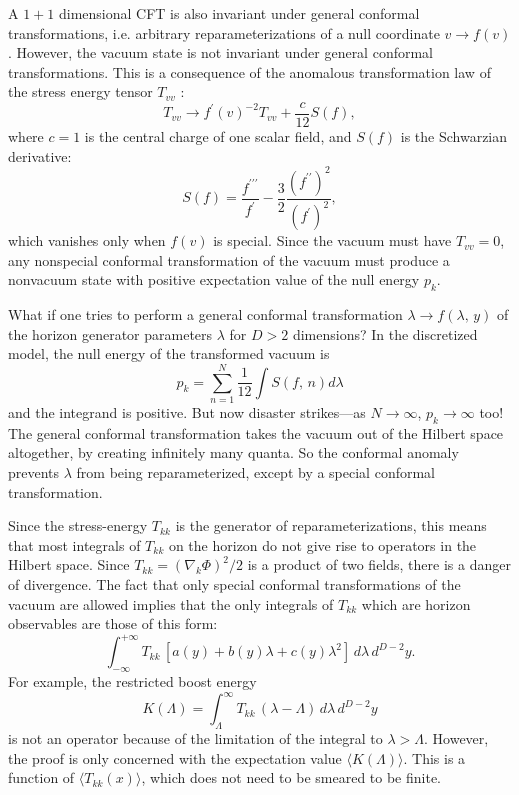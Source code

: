 \documentclass[12pt]{article}
\begin{document}
A $1+1$ dimensional CFT is also invariant under general conformal transformations, i.e. arbitrary reparameterizations of a null coordinate $v \to f(v)$.  However, the vacuum state is not invariant under general conformal transformations.  This is a consequence of the anomalous transformation law of the stress energy tensor $T_{vv}$ \cite{ginsparg89}:
\begin{equation}
T_{vv} \to f^\prime(v)^{-2} T_{vv} + \frac{c}{12} S(f),
\end{equation}
where $c = 1$ is the central charge of one scalar field, and $S(f)$ is the Schwarzian derivative:
\begin{equation}
S(f) =
\frac{f^{\prime\prime\prime}}{f^\prime} -
\frac{3}{2}\frac{(f^{\prime\prime})^2}{(f^\prime)^2},
\end{equation}
which vanishes only when $f(v)$ is special.  Since the vacuum must have $T_{vv} = 0$, any nonspecial conformal transformation of the vacuum must produce a nonvacuum state with positive expectation value of the null energy $p_k$.

What if one tries to perform a general conformal transformation $\lambda \to f(\lambda,\,y)$ of the horizon generator parameters $\lambda$ for $D > 2$ dimensions?  In the discretized model, the null energy of the transformed vacuum is
\begin{equation}
p_k = \sum_{n = 1}^N \frac{1}{12} \int S(f,\,n) d\lambda
\end{equation}
and the integrand is positive.  But now disaster strikes---as $N \to \infty$, $p_k \to \infty$ too!  The general conformal transformation takes the vacuum out of the Hilbert space altogether, by creating infinitely many quanta.  So the conformal anomaly prevents $\lambda$ from being reparameterized, except by a special conformal transformation.

Since the stress-energy $T_{kk}$ is the generator of reparameterizations, this means that most integrals of $T_{kk}$ on the horizon do not give rise to operators in the Hilbert space.  Since $T_{kk} = (\nabla_k \Phi)^2/2$ is a product of two fields, there is a danger of divergence.  The fact that only special conformal transformations of the vacuum are allowed implies that the only integrals of $T_{kk}$ which are horizon observables are those of this form:
\begin{equation}
\int^{+\infty}_{-\infty} T_{kk}\,[a(y) + b(y)\lambda + c(y)\lambda^2]\,d\lambda\,d^{D-2}y.
\end{equation}
For example, the restricted boost energy
\begin{equation}
K(\Lambda) = \int_\Lambda^\infty T_{kk}\,(\lambda - \Lambda) \,d\lambda\,d^{D-2}y
\end{equation}
is not an operator because of the limitation of the integral to $\lambda > \Lambda$.  However,
the proof is only concerned with the expectation value $\langle K(\Lambda) \rangle$.  This is a function of $\langle T_{kk}(x) \rangle$, which does not need to be smeared to be finite.
\end{document}
